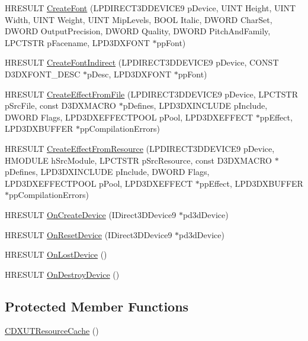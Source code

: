 \begin{DoxyCompactItemize}
\item 
HRESULT \hyperlink{class_c_d_x_u_t_resource_cache_a55e34fa53a7d702d20a20e6c79acd945}{CreateFont} (LPDIRECT3DDEVICE9 pDevice, UINT Height, UINT Width, UINT Weight, UINT MipLevels, BOOL Italic, DWORD CharSet, DWORD OutputPrecision, DWORD Quality, DWORD PitchAndFamily, LPCTSTR pFacename, LPD3DXFONT $\ast$ppFont)
\item 
HRESULT \hyperlink{class_c_d_x_u_t_resource_cache_ac3dc49f6b373324035d0833257b1501e}{CreateFontIndirect} (LPDIRECT3DDEVICE9 pDevice, CONST D3DXFONT\_\-DESC $\ast$pDesc, LPD3DXFONT $\ast$ppFont)
\item 
HRESULT \hyperlink{class_c_d_x_u_t_resource_cache_a7752a899e2deab9c7b691adc72c45792}{CreateEffectFromFile} (LPDIRECT3DDEVICE9 pDevice, LPCTSTR pSrcFile, const D3DXMACRO $\ast$pDefines, LPD3DXINCLUDE pInclude, DWORD Flags, LPD3DXEFFECTPOOL pPool, LPD3DXEFFECT $\ast$ppEffect, LPD3DXBUFFER $\ast$ppCompilationErrors)
\item 
HRESULT \hyperlink{class_c_d_x_u_t_resource_cache_a6bc96eb215a1888bdcbffcbb63e45f6d}{CreateEffectFromResource} (LPDIRECT3DDEVICE9 pDevice, HMODULE hSrcModule, LPCTSTR pSrcResource, const D3DXMACRO $\ast$pDefines, LPD3DXINCLUDE pInclude, DWORD Flags, LPD3DXEFFECTPOOL pPool, LPD3DXEFFECT $\ast$ppEffect, LPD3DXBUFFER $\ast$ppCompilationErrors)
\item 
HRESULT \hyperlink{class_c_d_x_u_t_resource_cache_ae502f51b236a110cd2d7470065d284b8}{OnCreateDevice} (IDirect3DDevice9 $\ast$pd3dDevice)
\item 
HRESULT \hyperlink{class_c_d_x_u_t_resource_cache_a10f3f5f8c73a0c64cb64e9647a1e3735}{OnResetDevice} (IDirect3DDevice9 $\ast$pd3dDevice)
\item 
HRESULT \hyperlink{class_c_d_x_u_t_resource_cache_abaf5192e33946915a9d1a3098ffdd17a}{OnLostDevice} ()
\item 
HRESULT \hyperlink{class_c_d_x_u_t_resource_cache_ac91b24c21474e187e21099c72583946e}{OnDestroyDevice} ()
\end{DoxyCompactItemize}
\subsection*{Protected Member Functions}
\begin{DoxyCompactItemize}
\item 
\hyperlink{class_c_d_x_u_t_resource_cache_a3bc1b064b7dd4522b89186491179e192}{CDXUTResourceCache} ()
\end{DoxyCompactItemize}
